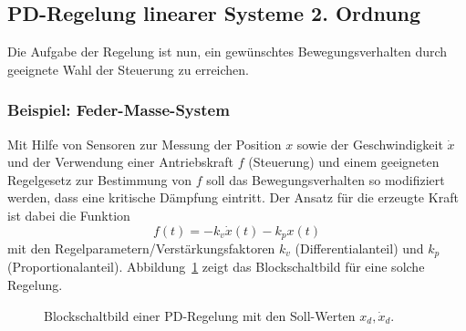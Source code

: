 \documentclass[a4paper, 11pt, accentcolor = tud3b]{tudreport}
\begin{document}
			\subsection{PD-Regelung linearer Systeme 2. Ordnung} %
				Die Aufgabe der Regelung ist nun, ein gewünschtes Bewegungsverhalten durch geeignete Wahl der Steuerung zu erreichen.

				\subsubsection{Beispiel: Feder-Masse-System} %
					Mit Hilfe von Sensoren zur Messung der Position \( x \) sowie der Geschwindigkeit \( \dot{x} \) und der Verwendung einer Antriebskraft \(f\) (Steuerung) und einem geeigneten Regelgesetz zur Bestimmung von \(f\) soll das Bewegungsverhalten so modifiziert werden, dass eine kritische Dämpfung eintritt. Der Ansatz für die erzeugte Kraft ist dabei die Funktion
					\begin{equation*}
						f(t) = -k_v \dot{x}(t) - k_p x(t)
					\end{equation*}
					mit den Regelparametern/Verstärkungsfaktoren \( k_v \) (Differentialanteil) und \( k_p \) (Proportionalanteil). Abbildung~\ref{fig:pd_control} zeigt das Blockschaltbild für eine solche Regelung.
					
					\begin{figure}
						\centering
						\caption{Blockschaltbild einer PD-Regelung mit den Soll-Werten \( x_d, \dot{x}_d \).}
						\label{fig:pd_control}
					\end{figure}
				
\end{document}
